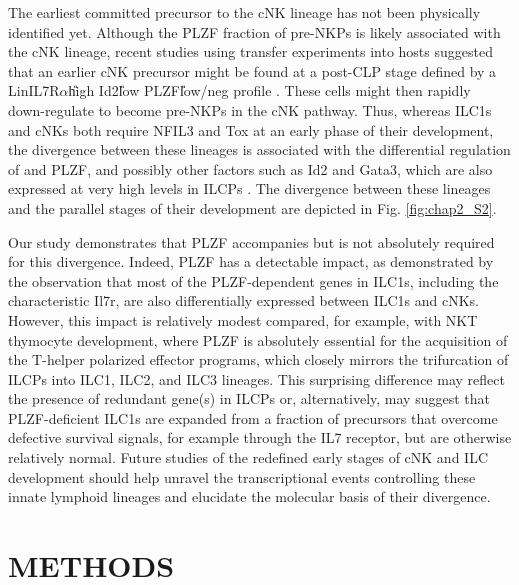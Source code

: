 The earliest committed precursor to the cNK lineage has not been physically identified yet. Although the PLZF\UM \ab\UM{} fraction of pre-NKPs is likely associated with the cNK lineage, recent studies using transfer experiments into \Ragrg hosts suggested that an earlier cNK precursor might be found at a post-CLP stage defined by a Lin\UM IL7R$\alpha$\UP \ab\U{high} Id2\U{low} PLZF\U{low/neg} profile \cite{klose2014,yu2014}. These cells might then rapidly down-regulate \ab{} to become pre-NKPs in the cNK pathway. Thus, whereas ILC1s and cNKs both require NFIL3 and Tox at an early phase of their development, the divergence between these lineages is associated with the differential regulation of \ab{} and PLZF, and possibly other factors such as Id2 and Gata3, which are also expressed at very high levels in ILCPs \cite{constantinides2014}. The divergence between these lineages and the parallel stages of their development are depicted in Fig. \ref{fig:chap2_S2}.

Our study demonstrates that PLZF accompanies but is not absolutely required for this divergence. Indeed, PLZF has a detectable impact, as demonstrated by the observation that most of the PLZF-dependent genes in ILC1s, including the characteristic Il7r, are also differentially expressed between ILC1s and cNKs. However, this impact is relatively modest compared, for example, with NKT thymocyte development, where PLZF is absolutely essential for the acquisition of the T-helper polarized effector programs, which closely mirrors the trifurcation of ILCPs into ILC1, ILC2, and ILC3 lineages. This surprising difference may reflect the presence of redundant gene(s) in ILCPs or, alternatively, may suggest that PLZF-deficient ILC1s are expanded from a fraction of precursors that overcome defective survival signals, for example through the IL7 receptor, but are otherwise relatively normal. Future studies of the redefined early stages of cNK and ILC development should help unravel the transcriptional events controlling these innate lymphoid lineages and elucidate the molecular basis of their divergence.

\section{METHODS}

